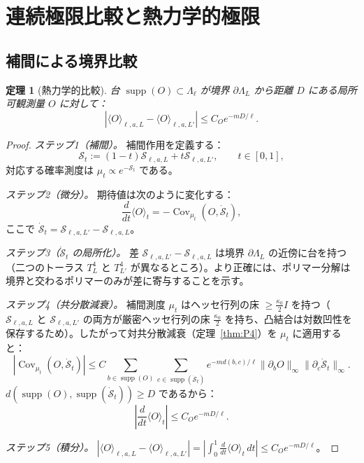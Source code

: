 \documentclass[12pt]{article}
\theoremstyle{plain}
\newtheorem{theorem}{定理}[section]
\theoremstyle{definition}
\numberwithin{equation}{section}
\newcommand{\Cov}{\operatorname{Cov}}
\newcommand{\supp}{\operatorname{supp}}
\begin{document}
\section{連続極限比較と熱力学的極限}\label{sec:continuum}

\subsection{補間による境界比較}

\begin{theorem}[熱力学的比較]\label{thm:thermocomp}
台 $\supp(O)\subset\Lambda_\ell$ が境界 $\partial\Lambda_L$ から距離 $D$ にある局所可観測量 $O$ に対して：
\begin{equation}
|\langle O\rangle_{\ell,a,L}-\langle O\rangle_{\ell,a,L'}| \leq C_O e^{-mD/\ell}.
\end{equation}
\end{theorem}

\begin{proof}
\emph{ステップ1（補間）。} 補間作用を定義する：
\begin{equation}
\mathcal{S}_t := (1-t)\mathcal{S}_{\ell,a,L}+t\mathcal{S}_{\ell,a,L'},\qquad t\in[0,1],
\end{equation}
対応する確率測度は $\mu_t\propto e^{-\mathcal{S}_t}$ である。

\emph{ステップ2（微分）。} 期待値は次のように変化する：
\begin{equation}
\frac{d}{dt}\langle O\rangle_t = -\Cov_{\mu_t}(O,\dot{\mathcal{S}}_t),
\end{equation}
ここで $\dot{\mathcal{S}}_t=\mathcal{S}_{\ell,a,L'}-\mathcal{S}_{\ell,a,L}$。

\emph{ステップ3（$\dot{\mathcal{S}}_t$ の局所化）。} 差 $\mathcal{S}_{\ell,a,L'}-\mathcal{S}_{\ell,a,L}$ は境界 $\partial\Lambda_L$ の近傍に台を持つ（二つのトーラス $T^4_L$ と $T^4_{L'}$ が異なるところ）。より正確には、ポリマー分解は境界と交わるポリマーのみが差に寄与することを示す。

\emph{ステップ4（共分散減衰）。} 補間測度 $\mu_t$ はヘッセ行列の床 $\geq\frac{\kappa_0}{2}I$ を持つ（$\mathcal{S}_{\ell,a,L}$ と $\mathcal{S}_{\ell,a,L'}$ の両方が厳密ヘッセ行列の床 $\frac{\kappa_0}{2}$ を持ち、凸結合は対数凹性を保存するため）。したがって対共分散減衰（定理~\ref{thm:P4}）を $\mu_t$ に適用すると：
\begin{equation}
|\Cov_{\mu_t}(O,\dot{\mathcal{S}}_t)| \leq C\sum_{b\in\supp(O)}\sum_{c\in\supp(\dot{\mathcal{S}}_t)}e^{-m d(b,c)/\ell}\|\partial_b O\|_\infty\|\partial_c\dot{\mathcal{S}}_t\|_\infty.
\end{equation}
$d(\supp(O),\supp(\dot{\mathcal{S}}_t))\geq D$ であるから：
\begin{equation}
\left|\frac{d}{dt}\langle O\rangle_t\right| \leq C_O e^{-mD/\ell}.
\end{equation}

\emph{ステップ5（積分）。} $|\langle O\rangle_{\ell,a,L}-\langle O\rangle_{\ell,a,L'}|=|\int_0^1\frac{d}{dt}\langle O\rangle_t\,dt|\leq C_O e^{-mD/\ell}$。
\end{proof}
\end{document}

